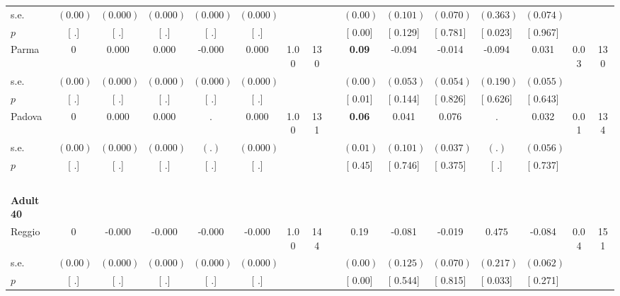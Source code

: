 \begin{longtable}{L{8em} c c c c c c c p{1em} c c c c c c c}
\quad \quad \quad \quad s.e.& $ (     0.00)$ & $ (    0.000)$ & $ (    0.000)$ & $ (    0.000)$ & $ (    0.000)$ & & & & $ (     0.00)$ & $ (    0.101)$ & $ (    0.070)$ & $ (    0.363)$ & $ (    0.074)$ & &  \\*
\quad \quad \quad \quad $ p$ & [        .] & [        .] & [        .] & [        .] & [        .] & & & & [     0.00] & [    0.129] & [    0.781] & [    0.023] & [    0.967] & &  \\[1em]
\quad \quad \quad Parma& 0 &     0.000 &     0.000 &    -0.000 &     0.000 &      1.00 &       130 & & \textbf{     0.09} &    -0.094 &    -0.014 &    -0.094 &     0.031 &      0.03 &       130  \\*
\quad \quad \quad \quad s.e.& $ (     0.00)$ & $ (    0.000)$ & $ (    0.000)$ & $ (    0.000)$ & $ (    0.000)$ & & & & $ (     0.00)$ & $ (    0.053)$ & $ (    0.054)$ & $ (    0.190)$ & $ (    0.055)$ & &  \\*
\quad \quad \quad \quad $ p$ & [        .] & [        .] & [        .] & [        .] & [        .] & & & & [     0.01] & [    0.144] & [    0.826] & [    0.626] & [    0.643] & &  \\[1em]
\quad \quad \quad Padova& 0 &     0.000 &     0.000 &         . &     0.000 &      1.00 &       131 & & \textbf{     0.06} &     0.041 &     0.076 &         . &     0.032 &      0.01 &       134  \\*
\quad \quad \quad \quad s.e.& $ (     0.00)$ & $ (    0.000)$ & $ (    0.000)$ & $ (        .)$ & $ (    0.000)$ & & & & $ (     0.01)$ & $ (    0.101)$ & $ (    0.037)$ & $ (        .)$ & $ (    0.056)$ & &  \\*
\quad \quad \quad \quad $ p$ & [        .] & [        .] & [        .] & [        .] & [        .] & & & & [     0.45] & [    0.746] & [    0.375] & [        .] & [    0.737] & &  \\[1em]
~\\[1em]
\quad \quad \textbf{Adult 40} & & & & & & & & & & & & & & & \\* 
\quad \quad \quad Reggio& 0 &    -0.000 &    -0.000 &    -0.000 &    -0.000 &      1.00 &       144 & & 0.19 &    -0.081 &    -0.019 & $ \mathbf{    0.475}$ &    -0.084 &      0.04 &       151  \\*
\quad \quad \quad \quad s.e.& $ (     0.00)$ & $ (    0.000)$ & $ (    0.000)$ & $ (    0.000)$ & $ (    0.000)$ & & & & $ (     0.00)$ & $ (    0.125)$ & $ (    0.070)$ & $ (    0.217)$ & $ (    0.062)$ & &  \\*
\quad \quad \quad \quad $ p$ & [        .] & [        .] & [        .] & [        .] & [        .] & & & & [     0.00] & [    0.544] & [    0.815] & [    0.033] & [    0.271] & &  \\[1em]

\end{longtable}

